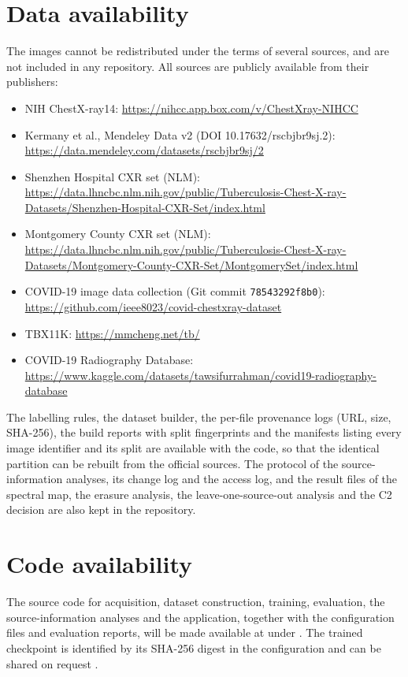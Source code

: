 \section*{Data availability}
The images cannot be redistributed under the terms of several sources, and are not included in any repository. All sources are publicly available from their publishers:
\begin{itemize}
\item NIH ChestX-ray14: \url{https://nihcc.app.box.com/v/ChestXray-NIHCC}
\item Kermany et al., Mendeley Data v2 (DOI 10.17632/rscbjbr9sj.2): \url{https://data.mendeley.com/datasets/rscbjbr9sj/2}
\item Shenzhen Hospital CXR set (NLM): \url{https://data.lhncbc.nlm.nih.gov/public/Tuberculosis-Chest-X-ray-Datasets/Shenzhen-Hospital-CXR-Set/index.html}
\item Montgomery County CXR set (NLM): \url{https://data.lhncbc.nlm.nih.gov/public/Tuberculosis-Chest-X-ray-Datasets/Montgomery-County-CXR-Set/MontgomerySet/index.html}
\item COVID-19 image data collection (Git commit \texttt{78543292f8b0}): \url{https://github.com/ieee8023/covid-chestxray-dataset}
\item TBX11K: \url{https://mmcheng.net/tb/}
\item COVID-19 Radiography Database: \url{https://www.kaggle.com/datasets/tawsifurrahman/covid19-radiography-database}
\end{itemize}
The labelling rules, the dataset builder, the per-file provenance logs (URL, size, SHA-256), the build reports with split fingerprints and the manifests listing every image identifier and its split are available with the code, so that the identical partition can be rebuilt from the official sources. The protocol of the source-information analyses, its change log and the access log, and the result files of the spectral map, the erasure analysis, the leave-one-source-out analysis and the C2 decision are also kept in the repository.

\section*{Code availability}
The source code for acquisition, dataset construction, training, evaluation, the source-information analyses and the application, together with the configuration files and evaluation reports, will be made available at  under . The trained checkpoint is identified by its SHA-256 digest in the configuration and can be shared on request .

